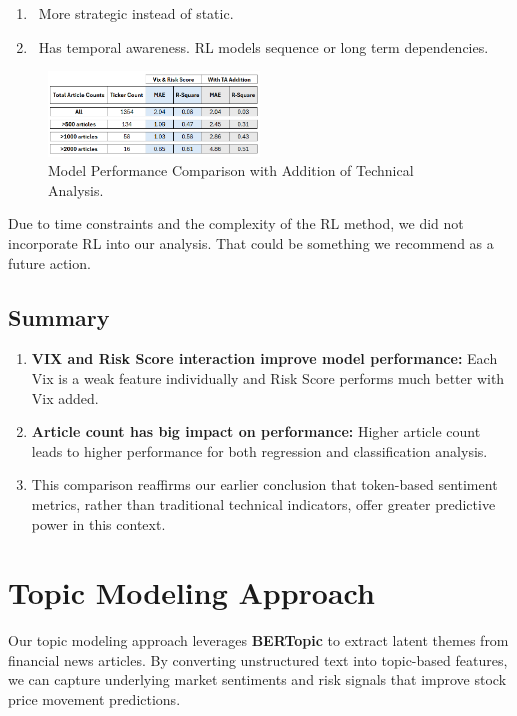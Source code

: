\documentclass[twocolumn]{article}
\begin{document}
\begin{enumerate}
    \item \ More strategic instead of static. 
    \item \ Has temporal awareness. RL models sequence or long term dependencies.
\end{enumerate}

\begin{figure}[ht]
    \centering
    \includegraphics[width=0.5\textwidth]{result with TA addtion.png}
    \caption{Model Performance Comparison with Addition of Technical Analysis.}
    \label{fig:result TA}
\end{figure}

Due to time constraints and the complexity of the RL method, we did not incorporate RL into our analysis. That could be something we recommend as a future action. 

\subsection{Summary}
\begin{enumerate}
    \item \textbf{VIX and Risk Score interaction improve model performance:} Each Vix is a weak feature individually and Risk Score performs much better with Vix added.

    \item \textbf{Article count has big impact on performance:} Higher article count leads to higher performance for both regression and classification analysis.  

    \item This comparison reaffirms our earlier conclusion that token-based sentiment metrics, rather than traditional technical indicators, offer greater predictive power in this context.

\end{enumerate}


\section{Topic Modeling Approach}
Our topic modeling approach leverages \textbf{BERTopic} to extract latent themes from financial news articles. By converting unstructured text into topic-based features, we can capture underlying market sentiments and risk signals that improve stock price movement predictions.
\end{document}
